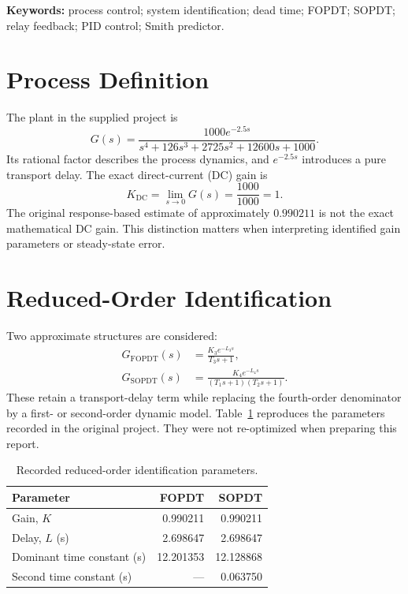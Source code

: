 \documentclass[11pt,a4paper]{article}
\newcommand{\sechead}[1]{\needspace{5\baselineskip}\section{#1}}
\begin{document}
\noindent\textbf{Keywords:} process control; system identification; dead time; FOPDT; SOPDT; relay feedback; PID control; Smith predictor.

\sechead{Process Definition}
The plant in the supplied project is
\begin{equation}
G(s)=\frac{1000e^{-2.5s}}{s^{4}+126s^{3}+2725s^{2}+12600s+1000}.
\label{eq:plant}
\end{equation}
Its rational factor describes the process dynamics, and $e^{-2.5s}$ introduces a pure transport delay. The exact direct-current (DC) gain is
\begin{equation}
K_{\mathrm{DC}}=\lim_{s\to0}G(s)=\frac{1000}{1000}=1.
\end{equation}
The original response-based estimate of approximately $0.990211$ is not the exact mathematical DC gain. This distinction matters when interpreting identified gain parameters or steady-state error.

\sechead{Reduced-Order Identification}
Two approximate structures are considered:
\begin{align}
G_{\mathrm{FOPDT}}(s)&=\frac{K_3e^{-L_3s}}{T_3s+1},\\
G_{\mathrm{SOPDT}}(s)&=\frac{K_4e^{-L_4s}}{(T_1s+1)(T_2s+1)}.
\end{align}
These retain a transport-delay term while replacing the fourth-order denominator by a first- or second-order dynamic model. Table~\ref{tab:identified} reproduces the parameters recorded in the original project. They were not re-optimized when preparing this report.
\begin{table}[H]\centering
\caption{Recorded reduced-order identification parameters.}\label{tab:identified}
\begin{tabular}{@{}lrr@{}}\toprule
Parameter & FOPDT & SOPDT\\\midrule
Gain, $K$ & 0.990211 & 0.990211\\
Delay, $L$ (s) & 2.698647 & 2.698647\\
Dominant time constant (s) & 12.201353 & 12.128868\\
Second time constant (s) & --- & 0.063750\\\bottomrule
\end{tabular}
\end{table}
\end{document}
